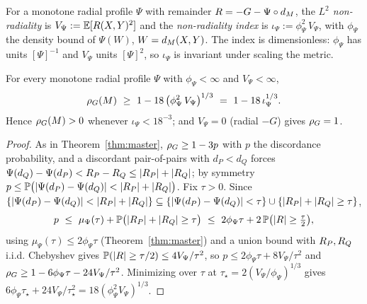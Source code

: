 \begin{definition}
For a monotone radial profile $\Psi$ with remainder $R=-G-\Psi\circ d_M$, the \emph{$L^2$
non-radiality} is $V_\Psi:=\mathbb E[R(X,Y)^2]$ and the \emph{non-radiality index} is
$\iota_\Psi:=\phi_\Psi^2\,V_\Psi$, with $\phi_\Psi$ the density bound of $\Psi(W)$,
$W=d_M(X,Y)$. The index is dimensionless: $\phi_\Psi$ has units $[\Psi]^{-1}$ and $V_\Psi$
units $[\Psi]^2$, so $\iota_\Psi$ is invariant under scaling the metric.
\end{definition}

\begin{theorem}\label{thm:dist}
For every monotone radial profile $\Psi$ with $\phi_\Psi<\infty$ and $V_\Psi<\infty$,
\[
\rhoG(M)\ \ge\ 1-18\,\bigl(\phi_\Psi^2\,V_\Psi\bigr)^{1/3}\ =\ 1-18\,\iota_\Psi^{1/3}.
\]
Hence $\rho_G(M)>0$ whenever $\iota_\Psi<18^{-3}$; and $V_\Psi=0$ (radial $-G$) gives
$\rho_G=1$.
\end{theorem}

\begin{proof}
As in Theorem~\ref{thm:master}, $\rho_G\ge1-3p$ with $p$ the discordance probability, and a
discordant pair-of-pairs with $d_P<d_Q$ forces
$\Psi(d_Q)-\Psi(d_P)<R_P-R_Q\le\lvert R_P\rvert+\lvert R_Q\rvert$; by symmetry
$p\le\mathbb P\bigl(\lvert\Psi(d_P)-\Psi(d_Q)\rvert<\lvert R_P\rvert+\lvert R_Q\rvert\bigr)$.
Fix $\tau>0$. Since
$\{\lvert\Psi(d_P)-\Psi(d_Q)\rvert<\lvert R_P\rvert+\lvert R_Q\rvert\}
\subseteq\{\lvert\Psi(d_P)-\Psi(d_Q)\rvert<\tau\}\cup\{\lvert R_P\rvert+\lvert R_Q\rvert\ge\tau\}$,
\[
p\ \le\ \mu_\Psi(\tau)+\mathbb P\bigl(\lvert R_P\rvert+\lvert R_Q\rvert\ge\tau\bigr)
\ \le\ 2\phi_\Psi\tau+2\,\mathbb P\bigl(\lvert R\rvert\ge\tfrac\tau2\bigr),
\]
using $\mu_\Psi(\tau)\le2\phi_\Psi\tau$ (Theorem~\ref{thm:master}) and a union bound with
$R_P,R_Q$ i.i.d. Chebyshev gives
$\mathbb P(\lvert R\rvert\ge\tau/2)\le4V_\Psi/\tau^2$, so
$p\le2\phi_\Psi\tau+8V_\Psi/\tau^2$ and $\rho_G\ge1-6\phi_\Psi\tau-24V_\Psi/\tau^2$.
Minimizing over $\tau$ at $\tau_\star=2(V_\Psi/\phi_\Psi)^{1/3}$ gives
$6\phi_\Psi\tau_\star+24V_\Psi/\tau_\star^2=18(\phi_\Psi^2V_\Psi)^{1/3}$.
\end{proof}

